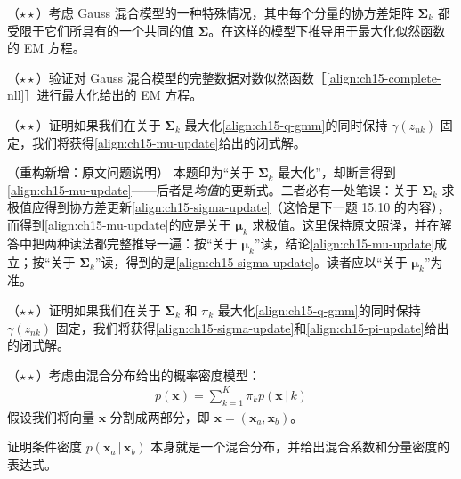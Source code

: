 \documentclass[../../main.tex]{subfiles}
\begin{document}
\begin{exercise}\label{exercise:ch15-07}
（$\star\star$）考虑 Gauss 混合模型的一种特殊情况，其中每个分量的协方差矩阵 $\bm{\Sigma}_k$ 都受限于它们所具有的一个共同的值 $\bm{\Sigma}$。在这样的模型下推导用于最大化似然函数的 EM 方程。
\end{exercise}

\begin{exercise}\label{exercise:ch15-08}
（$\star\star$）验证对 Gauss 混合模型的完整数据对数似然函数［\eqref{align:ch15-complete-nll}］进行最大化给出的 EM 方程。
\end{exercise}

\begin{exercise}\label{exercise:ch15-09}
（$\star\star$）证明如果我们在关于 $\bm{\Sigma}_k$ 最大化\eqref{align:ch15-q-gmm}的同时保持 $\gamma(z_{nk})$ 固定，我们将获得\eqref{align:ch15-mu-update}给出的闭式解。
\end{exercise}
\begin{remark}（重构新增：原文问题说明）
本题印为“关于 $\bm{\Sigma}_k$ 最大化”，却断言得到\eqref{align:ch15-mu-update}——后者是\emph{均值}的更新式。二者必有一处笔误：关于 $\bm{\Sigma}_k$ 求极值应得到协方差更新\eqref{align:ch15-sigma-update}（这恰是下一题 15.10 的内容），而得到\eqref{align:ch15-mu-update}的应是关于 $\bm{\mu}_k$ 求极值。这里保持原文照译，并在解答中把两种读法都完整推导一遍：按“关于 $\bm{\mu}_k$”读，结论\eqref{align:ch15-mu-update}成立；按“关于 $\bm{\Sigma}_k$”读，得到的是\eqref{align:ch15-sigma-update}。读者应以“关于 $\bm{\mu}_k$”为准。
\end{remark}

\begin{exercise}\label{exercise:ch15-10}
（$\star\star$）证明如果我们在关于 $\bm{\Sigma}_k$ 和 $\pi_k$ 最大化\eqref{align:ch15-q-gmm}的同时保持 $\gamma(z_{nk})$ 固定，我们将获得\eqref{align:ch15-sigma-update}和\eqref{align:ch15-pi-update}给出的闭式解。
\end{exercise}

\begin{exercise}\label{exercise:ch15-11}
（$\star\star$）考虑由混合分布给出的概率密度模型：
\begin{align}
p(\bm{x})=\sum_{k=1}^{K}\pi_k p(\bm{x}\,|\,k)
\label{align:ch15-ex-mixture}
\end{align}
假设我们将向量 $\bm{x}$ 分割成两部分，即 $\bm{x}=(\bm{x}_a,\bm{x}_b)$。

证明条件密度 $p(\bm{x}_a\,|\,\bm{x}_b)$ 本身就是一个混合分布，并给出混合系数和分量密度的表达式。
\end{exercise}
\end{document}
